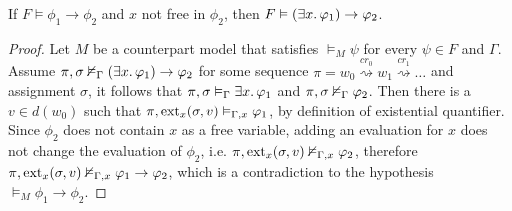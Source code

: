 \begin{lemma}\label{lem:par}
  If $F \vDash \phi_1 \to \phi_2$ and $x$ not free in $\phi_2$, then $F \vDash (\exists {x} \ldotp {\varphi_1}) \to \varphi_2$.
\end{lemma}
\begin{proof}
  Let $M$ be a counterpart model that satisfies $\vDash_M \psi$ for every $\psi \in F$ and $\Gamma$.
  Assume ${\pi}, {\sigma} \nvDash_{\Gamma} {(\exists {x} \ldotp {\varphi_1}) \to \varphi_2}$ for some sequence $\pi = w_0 \overset{cr_0}{\rightsquigarrow} w_1 \overset{cr_1}{\rightsquigarrow} \ldots$
  and assignment $\sigma$, it follows that ${\pi}, {\sigma} \vDash_{\Gamma} {\exists {x} \ldotp {\varphi_1}}$ and ${\pi}, {\sigma} \nvDash_{\Gamma} {\varphi_2}$.
  Then there is a $v \in d(w_0)$ such that ${\pi}, {\operatorname{ext}_{x}({\sigma},{v})} \vDash_{\Gamma, x} {\varphi_1}$, by definition of existential
  quantifier. Since $\phi_2$ does not contain $x$ as a free variable, adding an evaluation for $x$ does not change the
  evaluation of $\phi_2$, i.e. ${\pi}, {\operatorname{ext}_{x}({\sigma},{v})} \nvDash_{\Gamma, x} {\varphi_2}$, therefore
  ${\pi}, {\operatorname{ext}_{x}({\sigma},{v})} \nvDash_{\Gamma, x} {\varphi_1 \to \varphi_2}$, which is a contradiction to the hypothesis $\vDash_M
  \phi_1 \to \phi_2$.
\end{proof}

